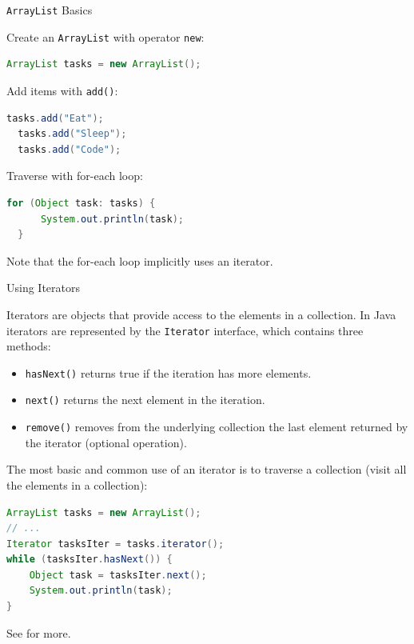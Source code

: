 \documentclass{beamer}
\begin{document}
\begin{frame}[fragile]{{\tt ArrayList} Basics}


Create an {\tt ArrayList} with operator {\tt new}:
\begin{lstlisting}[language=Java]
  ArrayList tasks = new ArrayList();
\end{lstlisting}
Add items with {\tt add()}:
\begin{lstlisting}[language=Java]
  tasks.add("Eat");
  tasks.add("Sleep");
  tasks.add("Code");
\end{lstlisting}
Traverse with for-each loop:
\begin{lstlisting}[language=Java]
  for (Object task: tasks) {
      System.out.println(task);
  }
\end{lstlisting}

Note that the for-each loop implicitly uses an iterator.

\end{frame}

\begin{frame}[fragile]{Using Iterators}


Iterators are objects that provide access to the elements in a collection.  In Java iterators are represented by the {\tt Iterator} interface, which contains three methods:
\begin{itemize}
\item {\tt hasNext()} returns true if the iteration has more elements.
\item {\tt next()} returns the next element in the iteration.
\item {\tt remove()} removes from the underlying collection the last element returned by the iterator (optional operation).
\end{itemize}

The most basic and common use of an iterator is to traverse a collection (visit all the elements in a collection):
\begin{lstlisting}[language=Java]
ArrayList tasks = new ArrayList();
// ...
Iterator tasksIter = tasks.iterator();
while (tasksIter.hasNext()) {
    Object task = tasksIter.next();
    System.out.println(task);
}
\end{lstlisting}
See  for more.

\end{frame}
\end{document}
